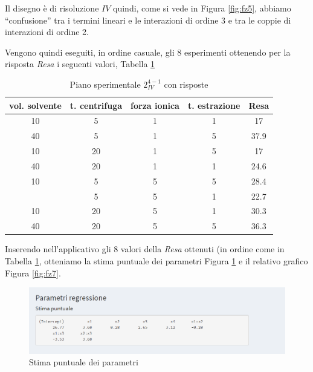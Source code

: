 \documentclass[
  11pt,
]{book}
\begin{document}
Il disegno è di risoluzione \(IV\) quindi, come si vede in Figura \ref{fig:fz5}, abbiamo ``confusione'' tra i termini lineari e le interazioni di ordine 3 e tra le coppie di interazioni di ordine 2.

Vengono quindi eseguiti, in ordine casuale, gli 8 esperimenti ottenendo per la risposta \emph{Resa} i seguenti valori, Tabella \ref{tab:fzpianorisp}

\begin{table}

\caption{\label{tab:fzpianorisp}Piano sperimentale $2_{IV}^{4-1}$ con risposte}
\centering
\begin{tabular}[t]{ccccc}
\toprule
vol. solvente & t. centrifuga & forza ionica & t. estrazione & Resa\\
\midrule
10 & 5 & 1 & 1 & 17\\
40 & 5 & 1 & 5 & 37.9\\
10 & 20 & 1 & 5 & 17\\
40 & 20 & 1 & 1 & 24.6\\
10 & 5 & 5 & 5 & 28.4\\
\addlinespace
40 & 5 & 5 & 1 & 22.7\\
10 & 20 & 5 & 1 & 30.3\\
40 & 20 & 5 & 5 & 36.3\\
\bottomrule
\end{tabular}
\end{table}

Inserendo nell'applicativo gli 8 valori della \emph{Resa} ottenuti (in ordine come in Tabella \ref{tab:fzpianorisp}, otteniamo la stima puntuale dei parametri Figura \ref{fig:fz6} e il relativo grafico Figura \ref{fig:fz7}.

\begin{figure}[ht]

{\centering \includegraphics[width=1\linewidth]{Immagini/Fraz/06_parametri} 

}

\caption{Stima puntuale dei parametri}\label{fig:fz6}
\end{figure}
\end{document}
